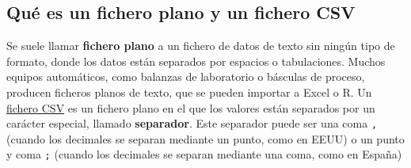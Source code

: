 \documentclass[
  letterpaper,
  DIV=11,
  numbers=noendperiod,
  oneside]{scrreprt}
\begin{document}
\hypertarget{quuxe9-es-un-fichero-plano-y-un-fichero-csv}{%
\subsection{Qué es un fichero plano y un fichero
CSV}\label{quuxe9-es-un-fichero-plano-y-un-fichero-csv}}

Se suele llamar \textbf{fichero plano} a un fichero de datos de texto
sin ningún tipo de formato, donde los datos están separados por espacios
o tabulaciones. Muchos equipos automáticos, como balanzas de laboratorio
o básculas de proceso, producen ficheros planos de texto, que se pueden
importar a Excel o R. Un
\href{https://es.wikipedia.org/wiki/Valores_separados_por_comas}{fichero
CSV} es un fichero plano en el que los valores están separados por un
carácter especial, llamado \textbf{separador}. Este separador puede ser
una coma \texttt{,} (cuando los decimales se separan mediante un punto,
como en EEUU) o un punto y coma \texttt{;} (cuando los decimales se
separan mediante una coma, como en España)
\end{document}
